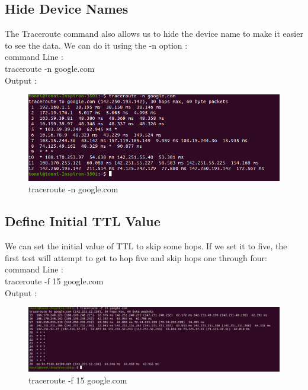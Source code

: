 \documentclass[11pt]{article}
\begin{document}
\subsection{Hide Device Names}
The Traceroute command also allows us to hide the device name to make it easier to see the data. We can do it using the -n option :\\[12pt]
command Line :\\[6pt]
  traceroute -n google.com\\[12pt]   
        Output : 
  \begin{figure}[!h]
\centering
\includegraphics[width=\textwidth]{hide-trace.png}
\caption{traceroute -n google.com}
\end{figure}

\subsection{Define Initial TTL Value}
We can set the initial value of TTL to skip some hops. If we set it to five, the first test will attempt to get to hop five and skip hops one through four:\\[12pt]
command Line :\\[6pt]
  traceroute -f 15 google.com\\[12pt]   
        Output : 
  \begin{figure}[!h]
\centering
\includegraphics[width=\textwidth]{define_trace.png}
\caption{traceroute -f 15 google.com}
\end{figure}
\end{document}
